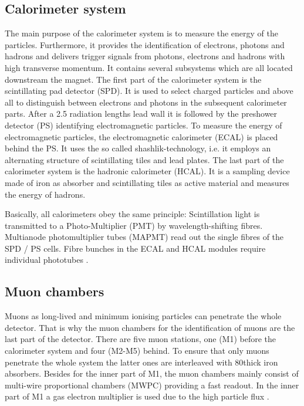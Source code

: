 \subsection{Calorimeter system}
The main purpose of the calorimeter system is to measure the energy of the particles.
Furthermore, it provides the identification of electrons, photons and hadrons and delivers trigger signals from photons, electrons and hadrons with high transverse momentum.
It contains several subsystems which are all located downstream the magnet.
The first part of the calorimeter system is the scintillating pad detector (SPD).
It is used to select charged particles and above all to distinguish between electrons and photons in the subsequent calorimeter parts.
After a 2.5 radiation lengths lead wall it is followed by the preshower detector (PS) identifying electromagnetic particles.
To measure the energy of electromagnetic particles, the electromagnetic calorimeter (ECAL) is placed behind the PS.
It uses the so called shashlik-technology, i.e. it employs an alternating structure of scintillating tiles and lead plates.
The last part of the calorimeter system is the hadronic calorimeter (HCAL).
It is a sampling device made of iron as absorber and scintillating tiles as active material and measures the energy of hadrons.

Basically, all calorimeters obey the same principle:
Scintillation light is transmitted to a Photo-Multiplier (PMT) by wavelength-shifting fibres.
Multianode photomultiplier tubes (MAPMT) read out the single fibres of the SPD / PS cells.
Fibre bunches in the ECAL and HCAL modules require individual phototubes \cite{detector, PS_SPD, Calorimeter_Running, ECAL, HCAL}.

\subsection{Muon chambers}
Muons as long-lived and minimum ionising particles can penetrate the whole detector.
That is why the muon chambers for the identification of muons are the last part of the detector.
There are five muon stations, one (M1) before the calorimeter system and four (M2-M5) behind.
To ensure that only muons penetrate the whole system the latter ones are interleaved with 80\cm thick iron absorbers.
Besides for the inner part of M1, the muon chambers mainly consist of multi-wire proportional chambers (MWPC) providing a fast readout.
In the inner part of M1 a gas electron multiplier is used due to the high particle flux \cite{detector, Muon_Performance}.

